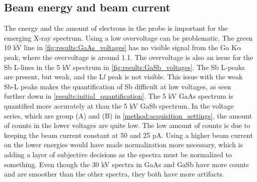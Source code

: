 




\subsection{Beam energy and beam current}
\label{results:beam_energy_and_beam_current}


The energy and the amount of electrons in the probe is important for the emerging X-ray spectrum.
Using a low overvoltage can be problematic.
The green 10 kV line in \cref{fig:results:GaAs_voltages} has no visible signal from the Ga K$\alpha$ peak, where the overvoltage is around 1.1.
The overvoltage is also an issue for the Sb L-lines in the 5 kV spectrum in \cref{fig:results:GaSb_voltages}.
The Sb L-peaks are present, but weak, and the L$l$ peak is not visible.
This issue with the weak Sb-L peaks makes the quantification of Sb difficult at low voltages, as seen further down in \cref{results:initial_quantification}.
The 5 kV GaAs spectrum is quantified more accurately at than the 5 kV GaSb spectrum.
In the voltage series, which are group (A) and (B) in \cref{method:acquisition_settings}, the amount of counts in the lower voltages are quite low.
The low amount of counts is due to keeping the beam current constant at 50 and 25 pA.
Using a higher beam current on the lower energies would have made normalization more necessary, which is adding a layer of subjective decisions as the spectra must be normalized to something.
Even though the 30 kV spectra in GaAs and GaSb have more counts and are smoother than the other spectra, they both have more artifacts.


